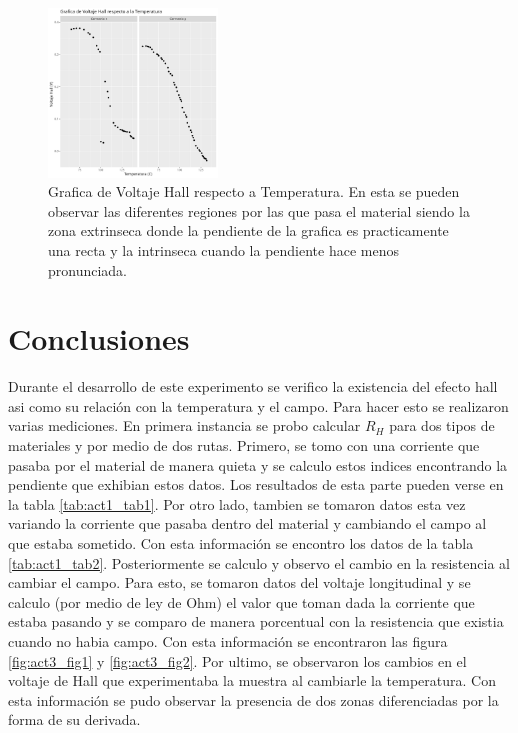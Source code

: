 \documentclass[a4paper, amsfonts, amssymb, amsmath, reprint, showkeys, nofootinbib, twoside]{revtex4-1}
\begin{document}
\begin{figure}
  \begin{center}
    \includegraphics[width=0.4\textwidth]{./img/Act4/temperatura.png}
  \end{center}
  \caption{Grafica de Voltaje Hall respecto a Temperatura. En esta se pueden observar las diferentes regiones por las que pasa el material siendo la zona extrinseca donde la pendiente de la grafica es practicamente una recta y la intrinseca cuando la pendiente hace menos pronunciada.}\label{fig:act4_fig1}
\end{figure}

\section{Conclusiones}

Durante el desarrollo de este experimento se verifico la existencia del efecto hall asi como su relación con la temperatura y el campo. Para hacer esto se realizaron varias mediciones. En primera instancia se probo calcular $R_H$ para dos tipos de materiales y por medio de dos rutas. Primero, se tomo con una corriente que pasaba por el material de manera quieta y se calculo estos indices encontrando la pendiente que exhibian estos datos. Los resultados de esta parte pueden verse en la tabla \ref{tab:act1_tab1}. Por otro lado, tambien se tomaron datos esta vez variando la corriente que pasaba dentro del material y cambiando el campo al que estaba sometido. Con esta información se encontro los datos de la tabla \ref{tab:act1_tab2}. Posteriormente se calculo y observo el cambio en la resistencia al cambiar el campo. Para esto, se tomaron datos del voltaje longitudinal y se calculo (por medio de ley de Ohm) el valor que toman dada la corriente que estaba pasando y se comparo de manera porcentual con la resistencia que existia cuando no habia campo. Con esta información se encontraron las figura \ref{fig:act3_fig1} y \ref{fig:act3_fig2}. Por ultimo, se observaron los cambios en el voltaje de Hall que experimentaba la muestra al cambiarle la temperatura. Con esta información se pudo observar la presencia de dos zonas diferenciadas por la forma de su derivada.
\end{document}
